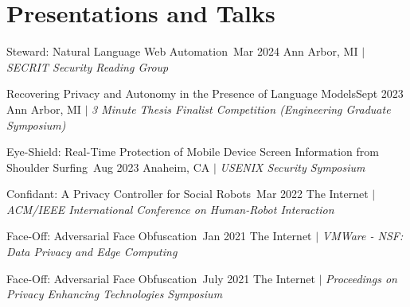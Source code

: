 \section{Presentations and Talks}
  \CVSubHeadingListStart
    \CVSubheading
      {{Steward: Natural Language Web Automation~\cite{steward}}}{Mar 2024}
      {{Ann Arbor, MI} $|$ \emph{\small{SECRIT Security Reading Group}}}{}

    \CVSubheading
      {{Recovering Privacy and Autonomy in the Presence of Language Models}}{Sept 2023}
      {{Ann Arbor, MI} $|$ \emph{\small{3 Minute Thesis Finalist Competition (Engineering Graduate Symposium)}}}{}

    \CVSubheading
      {{Eye-Shield: Real-Time Protection of Mobile Device Screen Information from Shoulder Surfing}~\cite{ShoulderSurfing}}{Aug 2023}
      {{Anaheim, CA} $|$ \emph{\small{USENIX Security Symposium}}}{}

    \CVSubheading
      {{Confidant: A Privacy Controller for Social Robots}~\cite{HRIPrivacy}}{Mar 2022}
      {{The Internet} $|$ \emph{\small{ACM/IEEE International Conference on Human-Robot Interaction}}}{}

    \CVSubheading
      {{Face-Off: Adversarial Face Obfuscation}~\cite{FaceOff}}{Jan 2021}
      {{The Internet} $|$ \emph{\small{VMWare - NSF: Data Privacy and Edge Computing}}}{}
      
    \CVSubheading
      {{Face-Off: Adversarial Face Obfuscation}~\cite{FaceOff}}{July 2021}
      {{The Internet} $|$ \emph{\small{Proceedings on Privacy Enhancing Technologies Symposium}}}{}
  \CVSubHeadingListEnd
